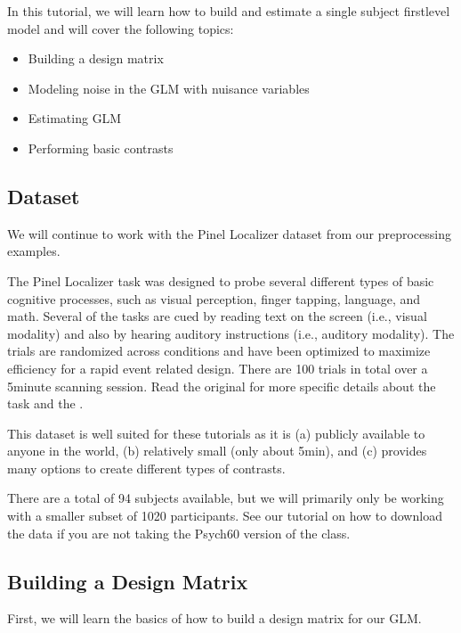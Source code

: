 \documentclass[letterpaper,10pt,english]{sphinxmanual}
\begin{document}
In this tutorial, we will learn how to build and estimate a single subject first\sphinxhyphen{}level model and will cover the following topics:
\begin{itemize}
\item {} 
Building a design matrix

\item {} 
Modeling noise in the GLM with nuisance variables

\item {} 
Estimating GLM

\item {} 
Performing basic contrasts

\end{itemize}


\subsection{Dataset}
\label{\detokenize{content/GLM_Single_Subject_Model:dataset}}
We will continue to work with the Pinel Localizer dataset from our preprocessing examples.

The Pinel Localizer task was designed to probe several different types of basic cognitive processes, such as visual perception, finger tapping, language, and math. Several of the tasks are cued by reading text on the screen (i.e., visual modality) and also by hearing auditory instructions (i.e., auditory modality). The trials are randomized across conditions and have been optimized to maximize efficiency for a rapid event related design. There are 100 trials in total over a 5\sphinxhyphen{}minute scanning session. Read the original  for more specific details about the task and the .

This dataset is well suited for these tutorials as it is (a) publicly available to anyone in the world, (b) relatively small (only about 5min), and (c) provides many options to create different types of contrasts.

There are a total of 94 subjects available, but we will primarily only be working with a smaller subset of 10\sphinxhyphen{}20 participants. See our tutorial on how to download the data if you are not taking the Psych60 version of the class.


\subsection{Building a Design Matrix}
\label{\detokenize{content/GLM_Single_Subject_Model:building-a-design-matrix}}
First, we will learn the basics of how to build a design matrix for our GLM.
\end{document}
